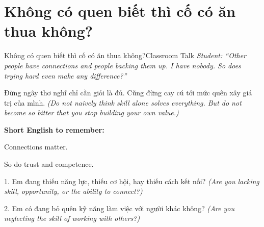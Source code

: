 \section{Không có quen biết thì cố có ăn thua không?}
\begin{truyen}{Không có quen biết thì cố có ăn thua không?}{Classroom Talk}
\textit{Student: ``Other people have connections and people backing them up. I have nobody. So does trying hard even make any difference?''}\\[4pt]



\end{truyen}

\begin{baihoc}
Đừng ngây thơ nghĩ chỉ cần giỏi là đủ. Cũng đừng cay cú tới mức quên xây giá trị của mình.
\textit{(Do not naively think skill alone solves everything. But do not become so bitter that you stop building your own value.)}
\end{baihoc}

\begin{ghinhoanh}
\textbf{Short English to remember:}

Connections matter.

So do trust and competence.
\end{ghinhoanh}

\begin{tuhocnhanh}
1. Em đang thiếu năng lực, thiếu cơ hội, hay thiếu cách kết nối? \textit{(Are you lacking skill, opportunity, or the ability to connect?)}

2. Em có đang bỏ quên kỹ năng làm việc với người khác không? \textit{(Are you neglecting the skill of working with others?)}
\end{tuhocnhanh}
\ngancach
